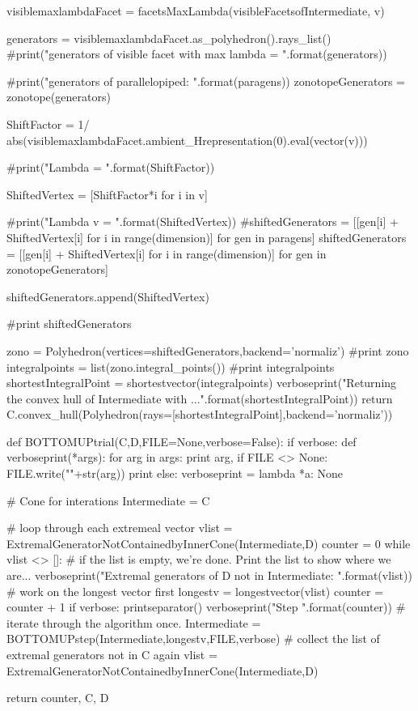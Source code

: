 \documentclass{TC}
\begin{document}
\begin{SAGE}
	visiblemaxlambdaFacet = facetsMaxLambda(visibleFacetsofIntermediate, v)

	generators =  visiblemaxlambdaFacet.as_polyhedron().rays_list()
	#print("generators of visible facet with max lambda = {}".format(generators))
	
	#print("generators of parallelopiped: {}".format(paragens))
	zonotopeGenerators = zonotope(generators)

	ShiftFactor = 1/ abs(visiblemaxlambdaFacet.ambient_Hrepresentation(0).eval(vector(v)))

	#print("Lambda = {}".format(ShiftFactor))

	ShiftedVertex = [ShiftFactor*i for i in v]

	#print("Lambda v = {}".format(ShiftedVertex))
	#shiftedGenerators = [[gen[i] + ShiftedVertex[i] for i in range(dimension)] for gen in paragens]
	shiftedGenerators = [[gen[i] + ShiftedVertex[i] for i in range(dimension)] for gen in zonotopeGenerators]

	shiftedGenerators.append(ShiftedVertex)


	#print shiftedGenerators


	zono = Polyhedron(vertices=shiftedGenerators,backend='normaliz')
	#print zono
	integralpoints = list(zono.integral_points())
	#print integralpoints
	shortestIntegralPoint = shortestvector(integralpoints)
	verboseprint("Returning the convex hull of Intermediate with {}...".format(shortestIntegralPoint))
	return C.convex_hull(Polyhedron(rays=[shortestIntegralPoint],backend='normaliz'))

def BOTTOMUPtrial(C,D,FILE=None,verbose=False):
	if verbose:
		def verboseprint(*args):
			for arg in args:
				print arg,
				if FILE <> None:
					FILE.write("\n"+str(arg))
			print
	else:
		verboseprint = lambda *a: None 
	
	# Cone for interations
	Intermediate = C 

	# loop through each extremeal vector
	vlist = ExtremalGeneratorNotContainedbyInnerCone(Intermediate,D)
	counter = 0
	while vlist <> []:
		# if the list is empty, we're done. Print the list to show where we are...
		verboseprint("Extremal generators of D not in Intermediate: {}".format(vlist))
		# work on the longest vector first
		longestv = longestvector(vlist)
		counter = counter + 1
		if verbose:
			printseparator()
		verboseprint("Step {}".format(counter))
		# iterate through the algorithm once. 
		Intermediate = BOTTOMUPstep(Intermediate,longestv,FILE,verbose)
		# collect the list of extremal generators not in C again
		vlist = ExtremalGeneratorNotContainedbyInnerCone(Intermediate,D)

	return counter, C, D
\end{SAGE}
\end{document}

